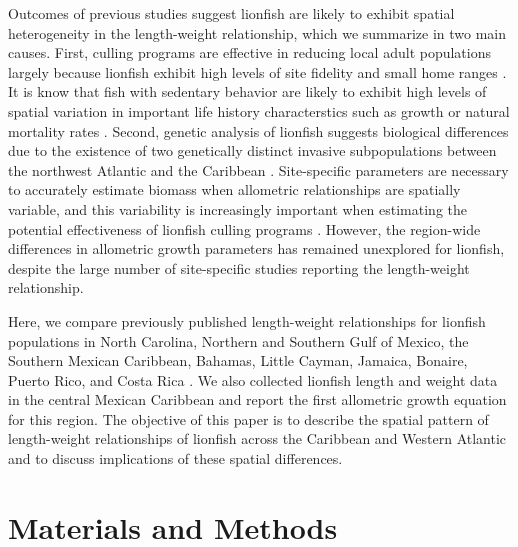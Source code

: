 \documentclass[12pt,]{article}
\theoremstyle{definition}
\theoremstyle{definition}
\theoremstyle{definition}
\theoremstyle{remark}
\begin{document}
Outcomes of previous studies suggest lionfish are likely to exhibit
spatial heterogeneity in the length-weight relationship, which we
summarize in two main causes. First, culling programs are effective in
reducing local adult populations largely because lionfish exhibit high
levels of site fidelity and small home ranges
\citep{Fishelson_1997,kochzius_2005,jud_2012,cote_2014}. It is know that
fish with sedentary behavior are likely to exhibit high levels of
spatial variation in important life history characterstics such as
growth or natural mortality rates
\citep{gunderson_2008,hutchinson_2008,wilson_2012,guan_2013}. Second,
genetic analysis of lionfish suggests biological differences due to the
existence of two genetically distinct invasive subpopulations between
the northwest Atlantic and the Caribbean \citep{betancurr_2011}.
Site-specific parameters are necessary to accurately estimate biomass
when allometric relationships are spatially variable, and this
variability is increasingly important when estimating the potential
effectiveness of lionfish culling programs
\citep{barbour_2011,morris_2011,cote_2014,johnston_2015}. However, the
region-wide differences in allometric growth parameters has remained
unexplored for lionfish, despite the large number of site-specific
studies reporting the length-weight relationship.

Here, we compare previously published length-weight relationships for
lionfish populations in North Carolina, Northern and Southern Gulf of
Mexico, the Southern Mexican Caribbean, Bahamas, Little Cayman, Jamaica,
Bonaire, Puerto Rico, and Costa Rica
\citep{barbour_2011,darling_2011,deleon_2013,fogg_2013,dahl_2014,edwards_2014,toledohernndez_2014,sandel_2015,aguilarperera_2016,sabidoitza_2016,sabidoitz_2016,chin_2016}.
We also collected lionfish length and weight data in the central Mexican
Caribbean and report the first allometric growth equation for this
region. The objective of this paper is to describe the spatial pattern
of length-weight relationships of lionfish across the Caribbean and
Western Atlantic and to discuss implications of these spatial
differences.

\section{Materials and Methods}\label{materials-and-methods}
\end{document}
